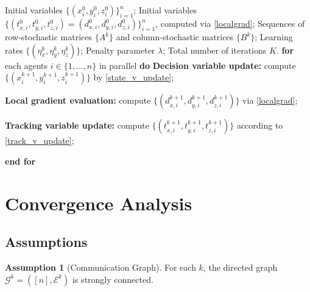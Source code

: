 \documentclass{article}
\theoremstyle{plain}
\theoremstyle{definition}
\newtheorem{assumption}[theorem]{Assumption}
\theoremstyle{remark}
\begin{document}
\begin{algorithm}[tb]
	\caption{\textbf{F}irst-order \textbf{A}B/Push-Pull-based \textbf{B}ilevel gradient algorithm (FAB)} 
	\label{alg1}
	\begin{algorithmic}[1]
		 Initial variables $\{(x_{i}^{0}, y_{i}^{0}, z_{i}^{0})\}_{i=1}^n$; 
        Initial variables $\{(t_{x,i}^{0}, t_{y,i}^{0}, t_{z,i}^{0})=(d_{x,i}^{0}, d_{y,i}^{0}, d_{z,i}^{0})\}_{i=1}^n$, computed via \eqref{localgrad}; 
        Sequences of row-stochastic matrices $\{A^{k}\}$ and column-stochastic matrices $\{B^{k}\}$; 
        Learning rates $\{(\eta_{x}^{k}, \eta_{y}^{k}, \eta_{z}^{k})\}$; Penalty parameter $\lambda$; Total number of iterations $K$.
		    \STATE \textbf{for} each agents $i \in \{1,\ldots,n\}$ in parallel \textbf{do}
		        \STATE \quad \textbf{Decision variable update:} \STATE \quad compute $\{(x_{i}^{k+1}, y_{i}^{k+1}, z_{i}^{k+1})\}$ by \eqref{state_v_update};
		        
		        \STATE \quad \textbf{Local gradient evaluation:}
		        \STATE \quad compute $\{(d_{x,i}^{k+1}, d_{y,i}^{k+1}, d_{z,i}^{k+1})\}$ via \eqref{localgrad};

                \STATE \quad \textbf{Tracking variable update:}
                \STATE \quad compute $\{(t_{x,i}^{k+1}, t_{y,i}^{k+1}, t_{z,i}^{k+1})\}$ according to \eqref{track_v_update};
                
		    \STATE \textbf{end for}
		\ENDFOR
	\end{algorithmic}
\end{algorithm}




\section{Convergence Analysis}


\subsection{Assumptions}


\begin{assumption}[Communication Graph]\label{ass:graph}
For each $k$, the directed graph $\mathcal{G}^{k}=([n],\mathcal{E}^{k})$ is strongly connected.
\end{assumption}
\end{document}
